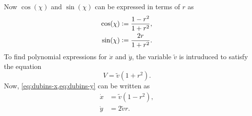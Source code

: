 Now $\cos(\chi)$ and $\sin(\chi)$ can be expressed in terms of $r$ as
\begin{subequations}\label{eq:cos-sin-r}
    \begin{align}
        \cos(\chi) &\vcentcolon= \frac{1 - r^2}{1 + r^2}, \label{eq:cos-r} \\
        \sin(\chi) &\vcentcolon= \frac{2r}{1 + r^2}.      \label{eq:sin-r}
    \end{align}
\end{subequations}
To find polynomial expressions for $\dot x$ and $\dot y$, the variable $\tilde v$ is intruduced to satisfy the equation
\begin{equation}\label{eq:constraint-V}
    V = \tilde v (1 + r^2).
\end{equation}
Now, \cref{eq:dubins-x,eq:dubins-y} can be written as
\begin{subequations}\label{eq:dubins-xy}
    \begin{align}
        \dot x &= \tilde v (1 - r^2), \label{eq:dubins-x-r} \\
        \dot y &= 2\tilde v r.        \label{eq:dubins-y-r}
    \end{align}
\end{subequations}

